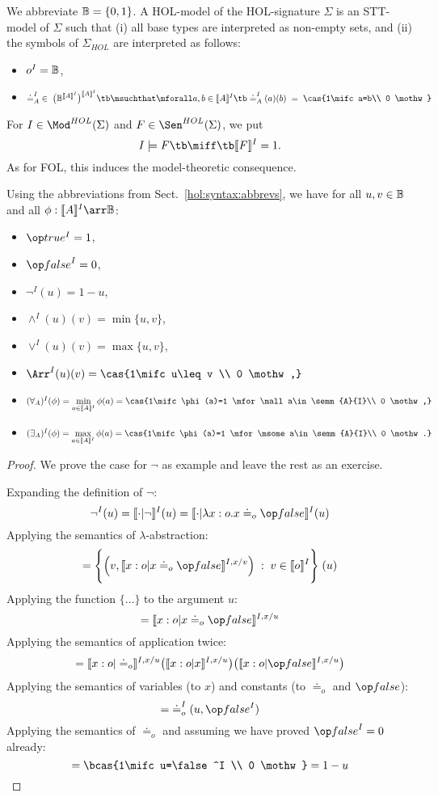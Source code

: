 \begin{definition}\label{def:hol:models}
We abbreviate $\mathbb{B}=\{0,1\}$.
A HOL-model of the HOL-signature $\Sigma$ is an STT-model of $\Sigma$ such that (i) all base types are interpreted as non-empty sets, and (ii) the symbols of $\Sigma_{HOL}$ are interpreted as follows:
\begin{itemize}
	\item $o^I=\mathbb{B}$,
	\item $\doteq_A^I \;\in\; \big(\Boole^{\semm{A}{I}}\big)^{\semm{A}{I}} \tb\msuchthat\mforall a,b\in\semm{A}{I}\tb \doteq_A^I(a)(b)\;=\;\cas{1\mifc a=b\\ 0 \mothw}$
\end{itemize}
For $I\in\Mod^{HOL}(\Sigma)$ and $F\in\Sen^{HOL}(\Sigma)$, we put
 \[I\md F \tb\miff\tb \semm{F}{I}=1.\]
As for FOL, this induces the model-theoretic consequence.
\end{definition}

\begin{lemma}\label{lem:hol:models}
Using the abbreviations from Sect.~\ref{hol:syntax:abbrevs}, we have for all $u,v\in\mathbb{B}$ and all $\phi:\semm{A}{I}\arr\Boole$:
\begin{itemize}
	\item $\true^I=1$,
	\item $\false^I=0$,
	\item $\neg^I(u)=1-u$,
  \item $\wedge^I(u)(v)=\min\{u,v\}$,
  \item $\vee^I(u)(v)=\max\{u,v\}$,
	\item $\impl^I(u)(v)=\cas{1\mifc u\leq v \\ 0 \mothw,}$
	\item $(\forall_A)^I(\phi)=\min\limits_{a\in \semm{A}{I}}\phi(a)
	  = \cas{1\mifc \phi(a)=1 \mfor\mall a\in\semm{A}{I}\\ 0 \mothw,}$
	\item $(\exists_A)^I(\phi) = \max\limits_{a\in \semm{A}{I}}\phi(a)
	  = \cas{1\mifc \phi(a)=1 \mfor\msome a\in\semm{A}{I}\\ 0 \mothw.}$
\end{itemize}
\end{lemma}
\begin{proof}
We prove the case for $\neg$ as example and leave the rest as an exercise.

Expanding the definition of $\neg$:
\[\neg^I(u)=\semcm{\cdot}{\neg}{I}(u)=\semcm{\cdot}{\lam{x}{o}x\doteq_o \false}{I}(u)\]
Applying the semantics of $\lambda$-abstraction:
\[=\Bigg\{\Big(v,\semcm{x:o}{x\doteq_o\false}{I,x/v}\Big)\;:\;v\in \semm{o}{I}\Bigg\} \;(u)\]
Applying the function $\Bigg\{\ldots\Bigg\}$ to the argument $u$:
\[=\semcm{x:o}{x\doteq_o\false}{I,x/u}\]
Applying the semantics of application twice:
\[=\semcm{x:o}{\doteq_o}{I,x/u}\big(\semcm{x:o}{x}{I,x/u}\big)\big(\semcm{x:o}{\false}{I,x/u}\big)\]
Applying the semantics of variables (to $x$) and constants (to $\doteq_o$ and $\false$):
\[=\;\doteq_o^I(u,\false^I)\]
Applying the semantics of $\doteq_o$ and assuming we have proved $\false^I=0$ already:
\[=\bcas{1\mifc u=\false^I \\ 0 \mothw}=1-u\]
\end{proof}

